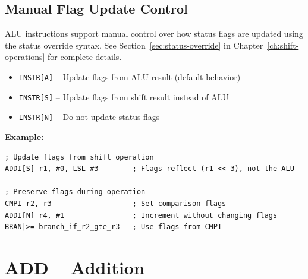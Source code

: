 \subsection{Manual Flag Update Control}

ALU instructions support manual control over how status flags are updated using the status override syntax. See
Section~\ref{sec:status-override} in Chapter~\ref{ch:shift-operations} for complete details.

\begin{itemize}
	\item \texttt{INSTR[A]} -- Update flags from ALU result (default behavior)
	\item \texttt{INSTR[S]} -- Update flags from shift result instead of ALU
	\item \texttt{INSTR[N]} -- Do not update status flags
\end{itemize}

\textbf{Example:}
\begin{lstlisting}
; Update flags from shift operation
ADDI[S] r1, #0, LSL #3        ; Flags reflect (r1 << 3), not the ALU

; Preserve flags during operation
CMPI r2, r3                   ; Set comparison flags
ADDI[N] r4, #1                ; Increment without changing flags
BRAN|>= branch_if_r2_gte_r3   ; Use flags from CMPI
\end{lstlisting}

\section{ADD -- Addition}

